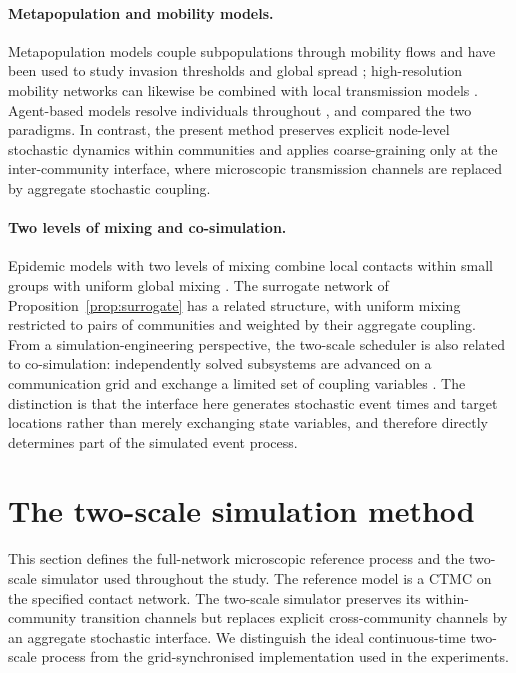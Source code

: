 \documentclass[a4paper,fleqn]{cas-sc}
\begin{document}
\paragraph{Metapopulation and mobility models.}
Metapopulation models couple subpopulations through mobility flows and have been used to study invasion thresholds and global spread \citep{colizza2007reaction,colizza2008,balcan2009,balcan2010modeling}; high-resolution mobility networks can likewise be combined with local transmission models \citep{chang2021}. Agent-based models resolve individuals throughout \citep{eubank2004,kerr2021}, and \citet{ajelli2010} compared the two paradigms. In contrast, the present method preserves explicit node-level stochastic dynamics within communities and applies coarse-graining only at the inter-community interface, where microscopic transmission channels are replaced by aggregate stochastic coupling.

\paragraph{Two levels of mixing and co-simulation.}
Epidemic models with two levels of mixing combine local contacts within small groups with uniform global mixing \citep{ball1997}. The surrogate network of Proposition~\ref{prop:surrogate} has a related structure, with uniform mixing restricted to pairs of communities and weighted by their aggregate coupling. From a simulation-engineering perspective, the two-scale scheduler is also related to co-simulation: independently solved subsystems are advanced on a communication grid and exchange a limited set of coupling variables \citep{gomes2018cosim}. The distinction is that the interface here generates stochastic event times and target locations rather than merely exchanging state variables, and therefore directly determines part of the simulated event process.

\section{The two-scale simulation method}
\label{sec:method}

This section defines the full-network microscopic reference process and the two-scale simulator used throughout the study. The reference model is a CTMC on the specified contact network. The two-scale simulator preserves its within-community transition channels but replaces explicit cross-community channels by an aggregate stochastic interface. We distinguish the ideal continuous-time two-scale process from the grid-synchronised implementation used in the experiments.
\end{document}

